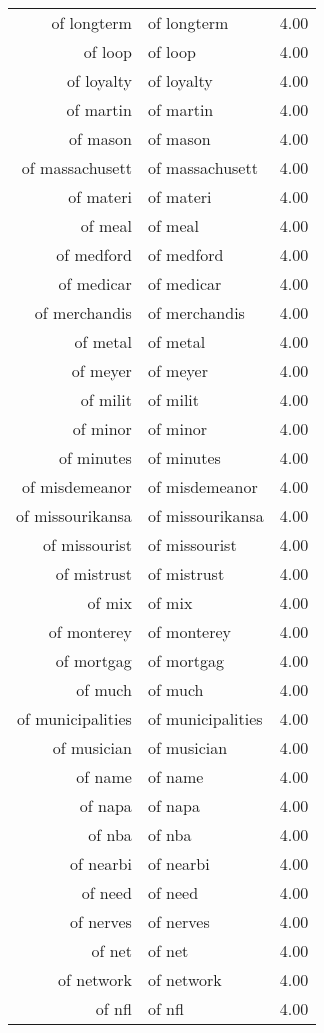 \begin{table}[ht]
\begin{tabular}{rlr}
  of longterm & of longterm & 4.00 \\ 
  of loop & of loop & 4.00 \\ 
  of loyalty & of loyalty & 4.00 \\ 
  of martin & of martin & 4.00 \\ 
  of mason & of mason & 4.00 \\ 
  of massachusett & of massachusett & 4.00 \\ 
  of materi & of materi & 4.00 \\ 
  of meal & of meal & 4.00 \\ 
  of medford & of medford & 4.00 \\ 
  of medicar & of medicar & 4.00 \\ 
  of merchandis & of merchandis & 4.00 \\ 
  of metal & of metal & 4.00 \\ 
  of meyer & of meyer & 4.00 \\ 
  of milit & of milit & 4.00 \\ 
  of minor & of minor & 4.00 \\ 
  of minutes & of minutes & 4.00 \\ 
  of misdemeanor & of misdemeanor & 4.00 \\ 
  of missourikansa & of missourikansa & 4.00 \\ 
  of missourist & of missourist & 4.00 \\ 
  of mistrust & of mistrust & 4.00 \\ 
  of mix & of mix & 4.00 \\ 
  of monterey & of monterey & 4.00 \\ 
  of mortgag & of mortgag & 4.00 \\ 
  of much & of much & 4.00 \\ 
  of municipalities & of municipalities & 4.00 \\ 
  of musician & of musician & 4.00 \\ 
  of name & of name & 4.00 \\ 
  of napa & of napa & 4.00 \\ 
  of nba & of nba & 4.00 \\ 
  of nearbi & of nearbi & 4.00 \\ 
  of need & of need & 4.00 \\ 
  of nerves & of nerves & 4.00 \\ 
  of net & of net & 4.00 \\ 
  of network & of network & 4.00 \\ 
  of nfl & of nfl & 4.00 \\ 

\end{tabular}
\end{table}
